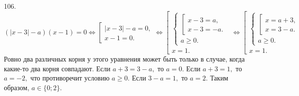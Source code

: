 106. $(|x-3|-a)(x-1)=0\Leftrightarrow \left[\begin{array}{l}|x-3|-a=0,\\ x-1=0.\end{array}\right.\Leftrightarrow
\left[\begin{array}{l}
\begin{cases}
\left[\begin{array}{l}
x-3=a,\\
x-3=-a.
\end{array}\right.\\
a\geqslant0.
\end{cases}\\
x=1.
\end{array}\right.\Leftrightarrow
\left[\begin{array}{l}
\begin{cases}
\left[\begin{array}{l}
x=a+3,\\
x=3-a.
\end{array}\right.\\
a\geqslant0.
\end{cases}\\
x=1.
\end{array}\right.$
Ровно два различных корня у этого уравнения может быть только в случае, когда какие-то два корня совпадают. Если $a+3=3-a,$ то $a=0.$ Если $a+3=1,$ то $a=-2,$ что противоречит условию $a\geqslant0.$ Если $3-a=1,$ то $a=2.$ Таким образом, $a\in\{0;2\}.$\\
